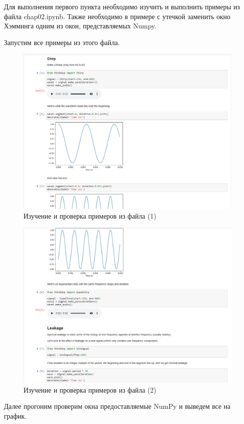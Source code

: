 \documentclass[a4paper, 14pt]{extarticle}
\begin{document}
    Для выполнения первого пункта необходимо изучить и выполнить примеры из файла chap02.ipynb.
    Также необходимо в примере с утечкой заменить окно Хэмминга одним из окон, представляемых Numpy.

    Запустим все примеры из этого файла.

    \begin{figure}[H]
        \centering
        \includegraphics[width=0.8\linewidth]{check_work_1}
        \caption{Изучение и проверка примеров из файла (1)}
        \label{fig:check_it_works_1}
    \end{figure}

    \begin{figure}[H]
        \centering
        \includegraphics[width=0.8\linewidth]{check_work_2}
        \caption{Изучение и проверка примеров из файла (2)}
        \label{fig:check_it_works_2}
    \end{figure}

    Далее прогоним проверим окна предоставляемые NumPy и выведем все на график.
\end{document}

